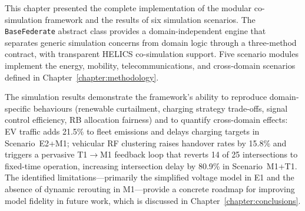 This chapter presented the complete implementation of the modular co-simulation framework and the results of six simulation scenarios. The \texttt{BaseFederate} abstract class provides a domain-independent engine that separates generic simulation concerns from domain logic through a three-method contract, with transparent HELICS co-simulation support. Five scenario modules implement the energy, mobility, telecommunications, and cross-domain scenarios defined in Chapter~\ref{chapter:methodology}.

The simulation results demonstrate the framework's ability to reproduce domain-specific behaviours (renewable curtailment, charging strategy trade-offs, signal control efficiency, RB allocation fairness) and to quantify cross-domain effects: EV traffic adds 21.5\% to fleet emissions and delays charging targets in Scenario~E2+M1; vehicular RF clustering raises handover rates by 15.8\% and triggers a pervasive T1$\rightarrow$M1 feedback loop that reverts 14 of 25 intersections to fixed-time operation, increasing intersection delay by 80.9\% in Scenario~M1+T1. The identified limitations---primarily the simplified voltage model in E1 and the absence of dynamic rerouting in M1---provide a concrete roadmap for improving model fidelity in future work, which is discussed in Chapter~\ref{chapter:conclusions}.


